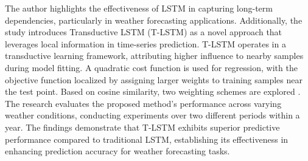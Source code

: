 \documentclass[sn-mathphys,Numbered]{sn-jnl}
\theoremstyle{thmstyleone}
\theoremstyle{thmstyletwo}
\theoremstyle{thmstylethree}
\begin{document}
\cite{XIAO2019111358} The author highlights the effectiveness of LSTM in capturing long-term dependencies, particularly in weather forecasting applications. Additionally, the study introduces Transductive LSTM (T-LSTM) as a novel approach that leverages local information in time-series prediction. T-LSTM operates in a transductive learning framework, attributing higher influence to nearby samples during model fitting. A quadratic cost function is used for regression, with the objective function localized by assigning larger weights to training samples near the test point. Based on cosine similarity, two weighting schemes are explored \cite{XIAO2019111358}.
The research evaluates the proposed method's performance across varying weather conditions, conducting experiments over two different periods within a year. The findings demonstrate that T-LSTM exhibits superior predictive performance compared to traditional LSTM, establishing its effectiveness in enhancing prediction accuracy for weather forecasting tasks.
\end{document}
